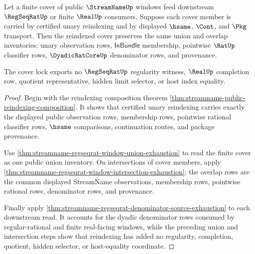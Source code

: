 \begin{theorem}
\label{thm:streamname-public-regseqrat-reindexing-cover-lock}
Let a finite cover of public $\StreamNameUp$ windows feed downstream
$\RegSeqRatUp$ or finite $\RealUp$ consumers. Suppose each cover member is
carried by certified unary reindexing and by displayed $\hsame$, $\Cont$, and
$\Pkg$ transport. Then the reindexed cover preserves the same union and overlap
inventories: unary observation rows, $\mathsf{InBundle}$ membership, pointwise
$\RatUp$ classifier rows, $\DyadicRatCoreUp$ denominator rows, and provenance.

The cover lock exports no $\RegSeqRatUp$ regularity witness, $\RealUp$
completion row, quotient representative, hidden limit selector, or host index
equality.
\end{theorem}
\begin{proof}
Begin with the reindexing composition theorem
\autoref{thm:streamname-public-reindexing-composition}. It shows that certified
unary reindexing carries exactly the displayed public observation rows,
membership rows, pointwise rational classifier rows, $\hsame$ comparisons,
continuation routes, and package provenance.

Use \autoref{thm:streamname-regseqrat-window-union-exhaustion} to read the
finite cover as one public union inventory. On intersections of cover members,
apply \autoref{thm:streamname-regseqrat-window-intersection-exhaustion}; the
overlap rows are the common displayed StreamName observations, membership
rows, pointwise rational rows, denominator rows, and provenance.

Finally apply
\autoref{thm:streamname-regseqrat-denominator-source-exhaustion} to each
downstream read. It accounts for the dyadic denominator rows consumed by
regular-rational and finite real-facing windows, while the preceding union and
intersection steps show that reindexing has added no regularity, completion,
quotient, hidden selector, or host-equality coordinate.
\end{proof}

